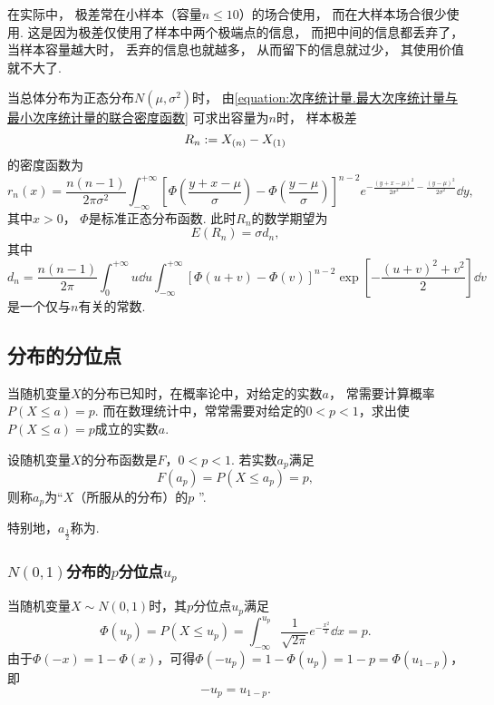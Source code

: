 在实际中，
极差常在小样本（容量\(n\leq10\)）的场合使用，
而在大样本场合很少使用.
这是因为极差仅使用了样本中两个极端点的信息，
而把中间的信息都丢弃了，
当样本容量越大时，
丢弃的信息也就越多，
从而留下的信息就过少，
其使用价值就不大了.

当总体分布为正态分布\(N(\mu,\sigma^2)\)时，
由\cref{equation:次序统计量.最大次序统计量与最小次序统计量的联合密度函数}
可求出容量为\(n\)时，
样本极差
\begin{equation}
	R_n
	:=
	X_{(n)} - X_{(1)}
\end{equation}
的密度函数为
\begin{equation}
	r_n(x)
	= \frac{n(n-1)}{2\pi\sigma^2}
	\int_{-\infty}^{+\infty} \left[
		\Phi\left(
			\frac{y+x-\mu}{\sigma}
		\right)
		- \Phi\left(
			\frac{y-\mu}{\sigma}
		\right)
	\right]^{n-2}
	e^{
		-\frac{(y+x-\mu)^2}{2\sigma^2}
		-\frac{(y-\mu)^2}{2\sigma^2}
	}
	\dd{y},
\end{equation}
其中\(x>0\)，
\(\Phi\)是标准正态分布函数.
此时\(R_n\)的数学期望为
\begin{equation}
	E(R_n)
	= \sigma d_n,
\end{equation}
其中\[
	d_n
	= \frac{n(n-1)}{2\pi}
	\int_0^{+\infty} u \dd{u}
	\int_{-\infty}^{+\infty}
	[\Phi(u+v) - \Phi(v)]^{n-2}
	\exp[
		-\frac{(u+v)^2+v^2}{2}
	]
	\dd{v}
\]是一个仅与\(n\)有关的常数.

\subsection{分布的分位点}
当随机变量\(X\)的分布已知时，在概率论中，对给定的实数\(a\)，
常需要计算概率\(P(X \leq a) = p\).
而在数理统计中，常常需要对给定的\(0<p<1\)，求出使\(P(X \leq a) = p\)成立的实数\(a\).

\begin{definition}
设随机变量\(X\)的分布函数是\(F\)，\(0<p<1\).
若实数\(a_p\)满足\begin{equation}
	F(a_p) = P(X \leq a_p) = p,
\end{equation}
则称\(a_p\)为“\(X\)（所服从的分布）的\(p\) ”.

特别地，\(a_{\frac{1}{2}}\)称为.
\end{definition}

\subsubsection{\texorpdfstring{\(N(0,1)\)分布的\(p\)分位点\(u_p\)}{标准正态分布的p分位点}}
当随机变量\(X \sim N(0,1)\)时，其\(p\)分位点\(u_p\)满足\[
\Phi(u_p)
= P(X \leq u_p)
= \int_{-\infty}^{u_p} \frac{1}{\sqrt{2\pi}} e^{-\frac{x^2}{2}} \dd{x}
= p.
\]由于\(\Phi(-x)=1-\Phi(x)\)，可得\(\Phi(-u_p)=1-\Phi(u_p)=1-p=\Phi(u_{1-p})\)，即\begin{equation}
-u_p=u_{1-p}.
\end{equation}

